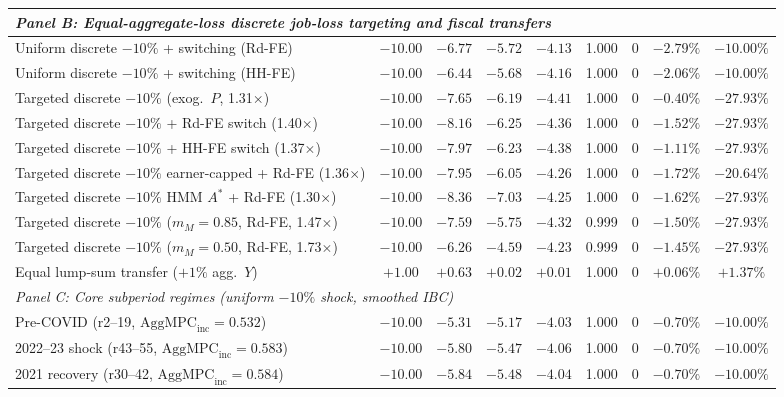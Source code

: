 \documentclass[11pt]{article}
\begin{document}
\begin{table}[tbp]
{\begin{tabular}{lcccccccc}
\midrule
\multicolumn{9}{l}{\textit{Panel B: Equal-aggregate-loss discrete job-loss targeting and fiscal transfers}} \\
\midrule
Uniform discrete $-10\%$ + switching (Rd-FE) & $-10.00$ & $-6.77$ & $-5.72$ & $-4.13$ & 1.000 & 0 & $-2.79\%$ & $-10.00\%$ \\
Uniform discrete $-10\%$ + switching (HH-FE) & $-10.00$ & $-6.44$ & $-5.68$ & $-4.16$ & 1.000 & 0 & $-2.06\%$ & $-10.00\%$ \\
Targeted discrete $-10\%$ (exog.\ $P$, 1.31$\times$) & $-10.00$ & $-7.65$ & $-6.19$ & $-4.41$ & 1.000 & 0 & $-0.40\%$ & $-27.93\%$ \\
Targeted discrete $-10\%$ + Rd-FE switch (1.40$\times$) & $-10.00$ & $-8.16$ & $-6.25$ & $-4.36$ & 1.000 & 0 & $-1.52\%$ & $-27.93\%$ \\
Targeted discrete $-10\%$ + HH-FE switch (1.37$\times$) & $-10.00$ & $-7.97$ & $-6.23$ & $-4.38$ & 1.000 & 0 & $-1.11\%$ & $-27.93\%$ \\
Targeted discrete $-10\%$ earner-capped + Rd-FE (1.36$\times$) & $-10.00$ & $-7.95$ & $-6.05$ & $-4.26$ & 1.000 & 0 & $-1.72\%$ & $-20.64\%$ \\
Targeted discrete $-10\%$ HMM $A^*$ + Rd-FE (1.30$\times$) & $-10.00$ & $-8.36$ & $-7.03$ & $-4.25$ & 1.000 & 0 & $-1.62\%$ & $-27.93\%$ \\
Targeted discrete $-10\%$ ($m_M=0.85$, Rd-FE, 1.47$\times$) & $-10.00$ & $-7.59$ & $-5.75$ & $-4.32$ & 0.999 & 0 & $-1.50\%$ & $-27.93\%$ \\
Targeted discrete $-10\%$ ($m_M=0.50$, Rd-FE, 1.73$\times$) & $-10.00$ & $-6.26$ & $-4.59$ & $-4.23$ & 0.999 & 0 & $-1.45\%$ & $-27.93\%$ \\
Equal lump-sum transfer ($+1\%$ agg.\ $Y$) & $+1.00$ & $+0.63$ & $+0.02$ & $+0.01$ & 1.000 & 0 & $+0.06\%$ & $+1.37\%$ \\
\midrule
\multicolumn{9}{l}{\textit{Panel C: Core subperiod regimes (uniform $-10\%$ shock, smoothed IBC)}} \\
\midrule
Pre-COVID (r2--19, $\text{AggMPC}_{\text{inc}} = 0.532$) & $-10.00$ & $-5.31$ & $-5.17$ & $-4.03$ & 1.000 & 0 & $-0.70\%$ & $-10.00\%$ \\
2022--23 shock (r43--55, $\text{AggMPC}_{\text{inc}} = 0.583$) & $-10.00$ & $-5.80$ & $-5.47$ & $-4.06$ & 1.000 & 0 & $-0.70\%$ & $-10.00\%$ \\
2021 recovery (r30--42, $\text{AggMPC}_{\text{inc}} = 0.584$) & $-10.00$ & $-5.84$ & $-5.48$ & $-4.04$ & 1.000 & 0 & $-0.70\%$ & $-10.00\%$ \\

\end{tabular}}
\end{table}
\end{document}
